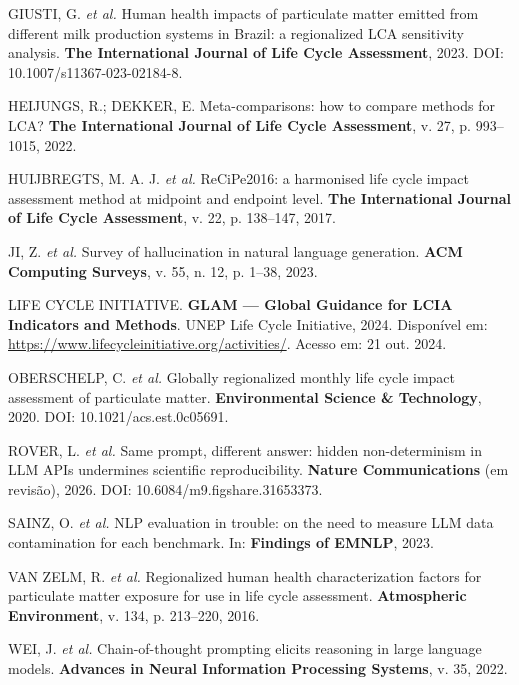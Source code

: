 \documentclass[12pt,a4paper]{article}
\begin{document}
\noindent GIUSTI, G. \emph{et al.} Human health impacts of particulate matter emitted from different milk production systems in Brazil: a regionalized LCA sensitivity analysis. \textbf{The International Journal of Life Cycle Assessment}, 2023. DOI: 10.1007/s11367-023-02184-8.

\noindent HEIJUNGS, R.; DEKKER, E. Meta-comparisons: how to compare methods for LCA? \textbf{The International Journal of Life Cycle Assessment}, v. 27, p. 993--1015, 2022.

\noindent HUIJBREGTS, M. A. J. \emph{et al.} ReCiPe2016: a harmonised life cycle impact assessment method at midpoint and endpoint level. \textbf{The International Journal of Life Cycle Assessment}, v. 22, p. 138--147, 2017.

\noindent JI, Z. \emph{et al.} Survey of hallucination in natural language generation. \textbf{ACM Computing Surveys}, v. 55, n. 12, p. 1--38, 2023.

\noindent LIFE CYCLE INITIATIVE. \textbf{GLAM --- Global Guidance for LCIA Indicators and Methods}. UNEP Life Cycle Initiative, 2024. Disponível em: \url{https://www.lifecycleinitiative.org/activities/}. Acesso em: 21 out. 2024.

\noindent OBERSCHELP, C. \emph{et al.} Globally regionalized monthly life cycle impact assessment of particulate matter. \textbf{Environmental Science \& Technology}, 2020. DOI: 10.1021/acs.est.0c05691.

\noindent ROVER, L. \emph{et al.} Same prompt, different answer: hidden non-determinism in LLM APIs undermines scientific reproducibility. \textbf{Nature Communications} (em revisão), 2026. DOI: 10.6084/m9.figshare.31653373.

\noindent SAINZ, O. \emph{et al.} NLP evaluation in trouble: on the need to measure LLM data contamination for each benchmark. In: \textbf{Findings of EMNLP}, 2023.

\noindent VAN ZELM, R. \emph{et al.} Regionalized human health characterization factors for particulate matter exposure for use in life cycle assessment. \textbf{Atmospheric Environment}, v. 134, p. 213--220, 2016.

\noindent WEI, J. \emph{et al.} Chain-of-thought prompting elicits reasoning in large language models. \textbf{Advances in Neural Information Processing Systems}, v. 35, 2022.

\endgroup
\end{document}
